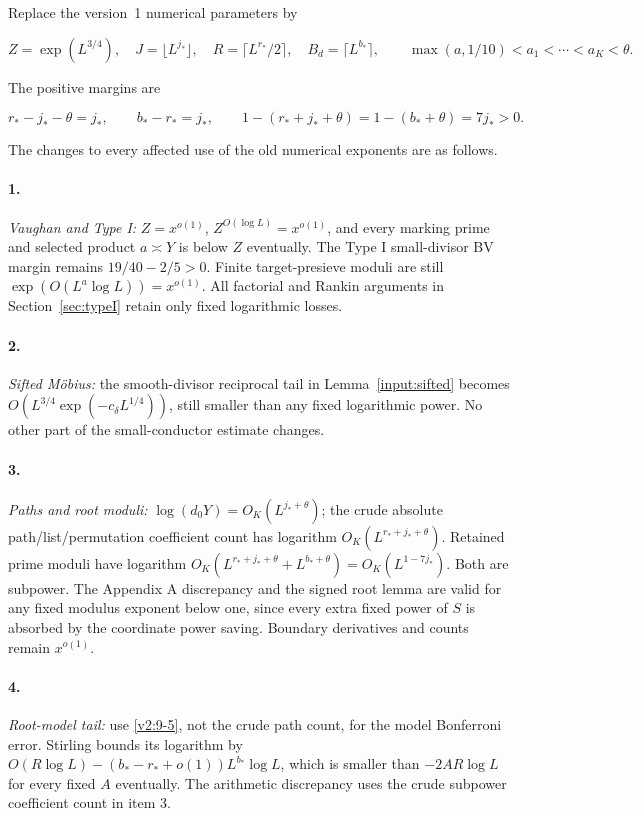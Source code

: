 \documentclass[11pt]{article}
\theoremstyle{definition}
\theoremstyle{remark}
\numberwithin{equation}{section}
\begin{document}
Replace the version~1 numerical parameters by


\begin{equation}\label{v2:9-6}
Z=\exp(L^{3/4}),\quad J=\lfloor L^{j_*}\rfloor,\quad
R=\lceil L^{r_*}/2\rceil,\quad
B_d=\lceil L^{b_*}\rceil,\qquad
\max(a,1/10)<a_1<\cdots<a_K<\theta.
\end{equation}


The positive margins are


\begin{equation}\label{v2:9-7}
r_*-j_*-\theta=j_*,\qquad
b_*-r_*=j_*,\qquad
1-(r_*+j_*+\theta)=1-(b_*+\theta)=7j_*>0.
\end{equation}


The changes to every affected use of the old numerical exponents are as follows.

\paragraph{1.} \emph{Vaughan and Type I:} $Z=x^{o(1)}$, $Z^{O(\log L)}=x^{o(1)}$, and every marking prime and selected product $a\asymp Y$ is below $Z$ eventually. The Type I small-divisor BV margin remains $19/40-2/5>0$. Finite target-presieve moduli are still $\exp(O(L^a\log L))=x^{o(1)}$. All factorial and Rankin arguments in Section~\ref{sec:typeI} retain only fixed logarithmic losses.
\paragraph{2.} \emph{Sifted M\"obius:} the smooth-divisor reciprocal tail in Lemma~\ref{input:sifted} becomes $O(L^{3/4}\exp(-c_\delta L^{1/4}))$, still smaller than any fixed logarithmic power. No other part of the small-conductor estimate changes.
\paragraph{3.} \emph{Paths and root moduli:} $\log(d_0Y)=O_K(L^{j_*+\theta})$; the crude absolute path/list/permutation coefficient count has logarithm $O_K(L^{r_*+j_*+\theta})$. Retained prime moduli have logarithm $O_K(L^{r_*+j_*+\theta}+L^{b_*+\theta})=O_K(L^{1-7j_*})$. Both are subpower. The Appendix A discrepancy and the signed root lemma are valid for any fixed modulus exponent below one, since every extra fixed power of $S$ is absorbed by the coordinate power saving. Boundary derivatives and counts remain $x^{o(1)}$.
\paragraph{4.} \emph{Root-model tail:} use \eqref{v2:9-5}, not the crude path count, for the model Bonferroni error. Stirling bounds its logarithm by $O(R\log L)-(b_*-r_*+o(1))L^{b_*}\log L$, which is smaller than $-2AR\log L$ for every fixed $A$ eventually. The arithmetic discrepancy uses the crude subpower coefficient count in item 3.
\end{document}
